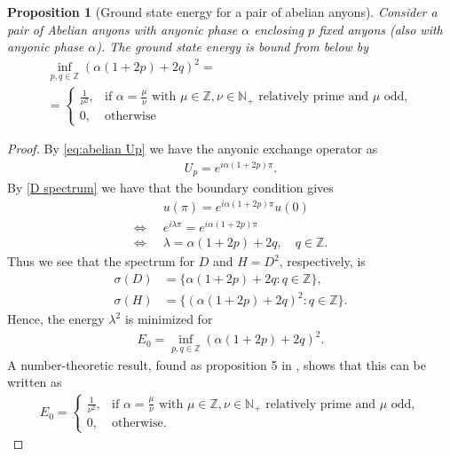 \documentclass[a4paper,10pt,oneside]{book}
\theoremstyle{plain}
\newtheorem{proposition}[theorem]{Proposition}
\theoremstyle{definition}
\theoremstyle{remark}
\begin{document}
\begin{proposition}[Ground state energy for a pair of abelian anyons]
  Consider a pair of Abelian anyons with anyonic phase $\alpha$ enclosing $p$ fixed anyons (also with anyonic phase $\alpha$).
  The ground state energy is bound from below by
    \begin{gather*}
      \inf_{p,q\in\mathbb{Z}} \left(\alpha(1+2p)+2q\right)^2 =\\
      = \begin{cases}
        \frac{1}{\nu^2}, & \text{if $\alpha = \frac{\mu}{\nu}$ with $\mu \in \mathbb{Z}, \nu \in \mathbb{N}_+$ relatively prime and $\mu$ odd}, \\
        0, & \text{otherwise}
      \end{cases}
    \end{gather*}
\end{proposition}

\begin{proof}
  By \cref{eq:abelian Up} we have the anyonic exchange operator as
  \begin{align*}
    U_p = e^{i\alpha(1+2p)π}.
  \end{align*}
  By \cref{D spectrum} we have that the boundary condition gives
  \begin{align*}
    &u(π) = e^{i\alpha(1+2p)π} u(0) \\
    \iff\;\; &e^{iλ π} = e^{i\alpha(1+2p)π} \\
    \iff\;\; &λ = \alpha(1+2p) + 2q, \quad q \in \mathbb{Z}.
  \end{align*}
  Thus we see that the spectrum for $D$ and $H = D^2$, respectively, is
  \begin{align*}
    σ(D) &= \{ \alpha(1+2p) + 2q : q \in \mathbb{Z}\}, \\
    σ(H) &= \{ (\alpha(1+2p) + 2q)^2 : q \in \mathbb{Z}\}.
  \end{align*}
  Hence, the energy $λ^2$ is minimized for
  \begin{align*}
    E_0 = \inf_{p,q\in\mathbb{Z}} (\alpha(1+2p)+2q)^2.
  \end{align*}
  A number-theoretic result, found as proposition 5 in \cite{lundholm-solovej}, shows that this can be written as
  \begin{align*}
    E_0 =
    \begin{cases}
      \frac{1}{\nu^2}, & \text{if $\alpha = \frac{\mu}{\nu}$ with $\mu \in \mathbb{Z}, \nu \in \mathbb{N}_+$ relatively prime and $\mu$ odd}, \\
      0, & \text{otherwise}.
    \end{cases}
  \end{align*}
\end{proof}
\end{document}
